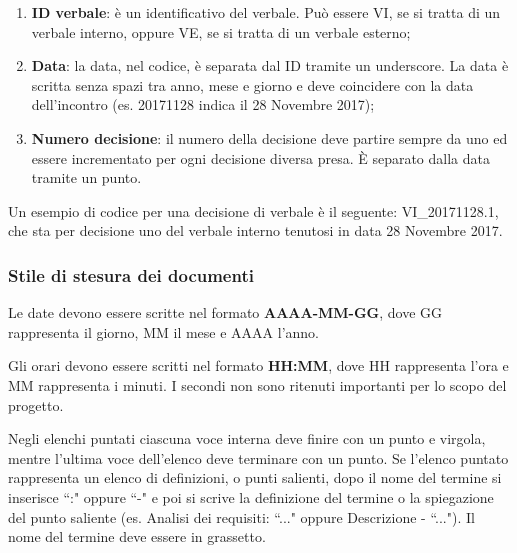 \begin{itemize}
                        \begin{enumerate}
                            \item \textbf{ID verbale}: è un identificativo del verbale. Può essere VI,
                            se si tratta di un verbale interno, oppure VE, se si tratta di
                            un verbale esterno;
                            \item \textbf{Data}: la data, nel codice, è separata dal ID tramite un
                            underscore.
                            La data è scritta senza spazi tra anno, mese e giorno e deve coincidere con la
                            data dell'incontro (es. 20171128 indica il 28 Novembre 2017);
                            \item \textbf{Numero decisione}: il numero della decisione deve partire sempre da
                            uno ed essere incrementato per ogni decisione diversa presa. È separato dalla
                            data tramite un punto.
                        \end{enumerate}

                        Un esempio di codice per una decisione di verbale è il seguente: VI\_20171128.1, che
                        sta per decisione uno del verbale interno tenutosi in data 28 Novembre 2017.
                    \end{itemize}

\newpage

		\subsubsection{Stile di stesura dei documenti}


				Le date devono essere scritte nel formato \textbf{AAAA-MM-GG}, dove GG rappresenta
				il giorno, MM il mese e AAAA l'anno.


				Gli orari devono essere scritti nel formato \textbf{HH:MM}, dove HH rappresenta l'ora 
				e MM rappresenta i minuti. 
				I secondi non sono ritenuti importanti per lo scopo del progetto.


				Negli elenchi puntati ciascuna voce interna deve finire con un punto e virgola,
				mentre l'ultima voce dell'elenco deve terminare con un punto. 
				Se l'elenco puntato rappresenta un elenco di definizioni, o punti salienti, dopo il
				nome del termine si inserisce ``:" oppure ``-" e poi si scrive la definizione del termine o la
				spiegazione del punto saliente (es. Analisi dei requisiti: ``..." oppure Descrizione - ``...").
				Il nome del termine deve essere in grassetto.

